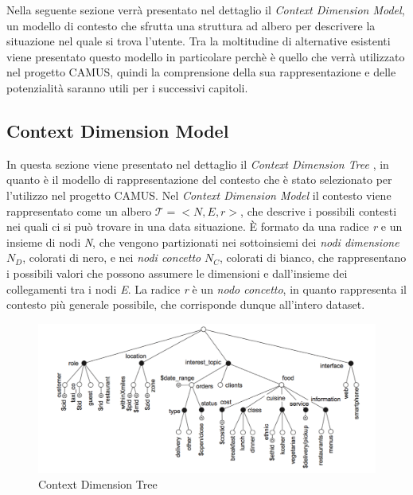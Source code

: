 Nella seguente sezione verrà presentato nel dettaglio il \emph{Context Dimension Model}, un modello di contesto che sfrutta una struttura ad albero per descrivere la situazione nel quale si trova l'utente. Tra la moltitudine di alternative esistenti viene presentato questo modello in particolare perchè è quello che verrà utilizzato nel progetto CAMUS, quindi la comprensione della sua rappresentazione e delle potenzialità saranno utili per i successivi capitoli.

\subsection{Context Dimension Model\label{sec:context-dimension-model}}

In questa sezione viene presentato nel dettaglio il \emph{Context Dimension Tree} \cite{DBLP:journals/is/BolchiniQT13}, in quanto è il modello di rappresentazione del contesto che è stato selezionato per l'utilizzo nel progetto CAMUS. Nel \emph{Context Dimension Model} il contesto viene rappresentato come un albero $\mathcal{T} = {<}N, E, r{>} $, che descrive i possibili contesti nei quali ci si può trovare in una data situazione. \`E formato da una radice \emph{r} e un insieme di nodi \emph{N}, che vengono partizionati nei sottoinsiemi dei \emph{nodi dimensione} $N_D$, colorati di nero, e nei \emph{nodi concetto} $N_C$, colorati di bianco, che rappresentano i possibili valori che possono assumere le dimensioni e dall'insieme dei collegamenti tra i nodi \emph{E}. La radice \emph{r} è un \emph{nodo concetto}, in quanto rappresenta il contesto più generale possibile, che corrisponde dunque all'intero dataset.

\begin{figure}[ht]
	\centering
	\includegraphics[width=\textwidth]{2-nozioni-preliminari/Immagini/esempio_cdt.png}
	\caption{Context Dimension Tree}\label{fig:context-dimension-tree}
\end{figure}

